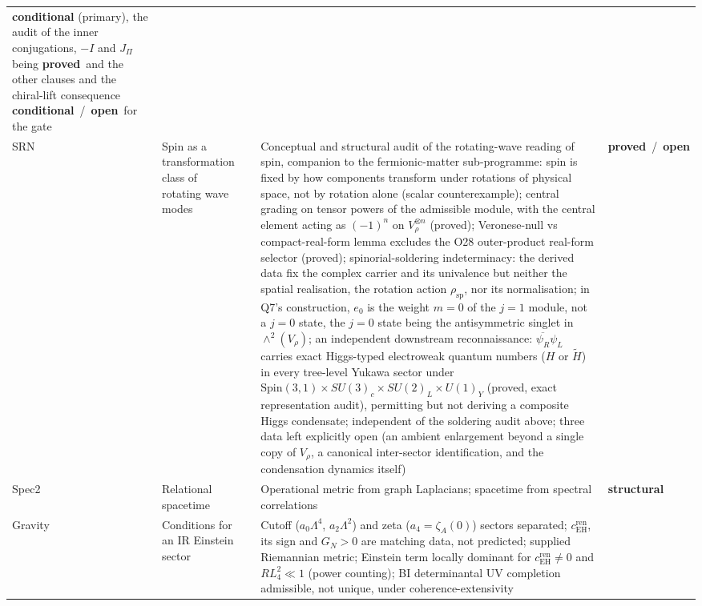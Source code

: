 \documentclass[11pt,a4paper]{article}
\newcommand{\sproved}{\textcolor{cproved}{\textbf{proved}}}
\newcommand{\sstruct}{\textcolor{cstruct}{\textbf{structural}}}
\newcommand{\sopen}{\textcolor{copen}{\textbf{open}}}
\newcommand{\scond}{\textcolor{ccond}{\textbf{conditional}}}
\begin{document}
\begin{longtable}{@{}p{1.70cm}p{2.9cm}p{1.3cm}p{6.25cm}>{\raggedright\arraybackslash}p{2.0cm}@{}}
      \scond{} (primary), the audit of the inner conjugations, $-I$ and $J_\Pi$ being \sproved\ and the other clauses and the
      chiral-lift consequence \scond{}\ /\ \sopen\ for the gate \\[3pt]
      SRN & Spin as a transformation class of rotating wave modes & \cite{Beau2026srn} &
      Conceptual and structural audit of the rotating-wave reading of spin, companion to the
      fermionic-matter sub-programme: spin is fixed by how components transform under rotations of
      physical space, not by rotation alone (scalar counterexample); central grading on tensor powers
      of the admissible module, with the central element acting as $(-1)^n$ on
      $V_\rho^{\otimes n}$ (proved); Veronese-null vs compact-real-form lemma excludes the O28
      outer-product real-form selector (proved); spinorial-soldering indeterminacy: the derived data
      fix the complex carrier and its univalence but neither the spatial realisation, the rotation
      action $\rho_{\mathrm{sp}}$, nor its normalisation;
      in Q7's construction, $e_0$ is the weight $m=0$ of the $j=1$ module, not a $j=0$ state, the $j=0$
      state being the antisymmetric singlet in $\wedge^2(V_\rho)$;
      an independent downstream reconnaissance: $\overline{\psi_R}\psi_L$ carries
      exact Higgs-typed electroweak quantum numbers ($H$ or $\widetilde H$) in every tree-level
      Yukawa sector under $\mathrm{Spin}(3,1)\times SU(3)_c\times SU(2)_L\times U(1)_Y$ (proved,
      exact representation audit), permitting but not deriving a composite Higgs condensate;
      independent of the soldering audit above; three data left explicitly open (an ambient
      enlargement beyond a single copy of $V_\rho$, a canonical inter-sector identification, and the condensation
      dynamics itself) &
      \sproved\ /\ \sopen \\[3pt]
      \midrule
      Spec2 & Relational spacetime & \cite{Beau2026a} &
      Operational metric from graph Laplacians; spacetime from spectral correlations &
      \sstruct \\[3pt]
      Gravity & Conditions for an IR Einstein sector & \cite{Beau2026h} &
      Cutoff ($a_0\Lambda^4$, $a_2\Lambda^2$) and zeta ($a_4 = \zeta_A(0)$) sectors separated;
      $c_{\mathrm{EH}}^{\mathrm{ren}}$, its sign and $G_N > 0$ are matching data, not predicted;
      supplied Riemannian metric; Einstein term locally dominant for $c_{\mathrm{EH}}^{\mathrm{ren}} \neq 0$ and
      $RL_4^2 \ll 1$ (power counting); BI determinantal UV completion admissible, not unique, under
      coherence-extensivity &

\end{longtable}
\end{document}

